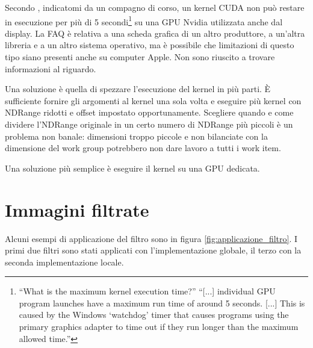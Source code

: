 \documentclass[10pt]{myarticle}
\begin{document}
Secondo \cite{nvidiakernel}, indicatomi da un compagno di corso, un kernel CUDA non pu\`o restare in esecuzione per pi\`u di 5 secondi\footnote{``What is the maximum kernel execution time?'' ``[...] individual GPU program launches have a maximum run time of around 5 seconds. [...] This is caused by the Windows `watchdog' timer that causes programs using the primary graphics adapter to time out if they run longer than the maximum allowed time.''} su una GPU Nvidia utilizzata anche dal display.
La FAQ \`e relativa a una scheda grafica di un altro produttore, a un'altra libreria e a un altro sistema operativo, ma \`e possibile che limitazioni di questo tipo siano presenti anche su computer Apple.
Non sono riuscito a trovare informazioni al riguardo.

Una soluzione \`e quella di spezzare l'esecuzione del kernel in pi\`u parti.
\`E sufficiente fornire gli argomenti al kernel una sola volta e eseguire pi\`u kernel con NDRange ridotti e offset impostato opportunamente.
Scegliere quando e come dividere l'NDRange originale in un certo numero di NDRange pi\`u piccoli \`e un problema non banale: dimensioni troppo piccole e non bilanciate con la dimensione del work group potrebbero non dare lavoro a tutti i work item.

Una soluzione pi\`u semplice \`e eseguire il kernel su una GPU dedicata.

\section{Immagini filtrate}

Alcuni esempi di applicazione del filtro sono in figura \ref{fig:applicazione_filtro}.
I primi due filtri sono stati applicati con l'implementazione globale, il terzo con la seconda implementazione locale.
\end{document}
